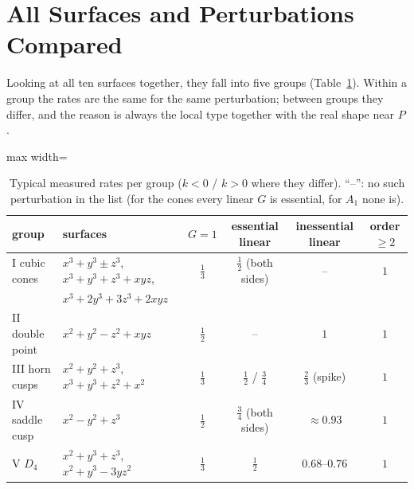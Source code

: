 \documentclass[12pt, a4paper, oneside]{book}
\theoremstyle{plain}
\theoremstyle{definition}
\theoremstyle{remark}
\theoremstyle{definition}
\begin{document}
\section{All Surfaces and Perturbations Compared}
\label{sec:r-groupF}

Looking at all ten surfaces together, they fall into five groups (Table~\ref{tab:r-groups}). Within a group the rates are the same for the same perturbation; between groups they differ, and the reason is always the local type together with the real shape near $P$.

\begin{table}[!h]
\centering
\small
\begin{adjustbox}{max width=\textwidth}
\begin{tabular}{l l c c c c}
\toprule
group & surfaces & $G=1$ & essential linear & inessential linear & order $\ge2$ \\
\midrule
I cubic cones & $x^3+y^3\pm z^3$, $x^3+y^3+z^3+xyz$, & $\tfrac13$ & $\tfrac12$ (both sides) & -- & $1$ \\
 & $x^3+2y^3+3z^3+2xyz$ & & & & \\
II double point & $x^2+y^2-z^2+xyz$ & $\tfrac12$ & -- & $1$ & $1$ \\
III horn cusps & $x^2+y^2+z^3$, $x^3+y^3+z^2+x^2$ & $\tfrac13$ & $\tfrac12$ / $\tfrac34$ & $\tfrac23$ (spike) & $1$ \\
IV saddle cusp & $x^2-y^2+z^3$ & $\tfrac12$ & $\tfrac34$ (both sides) & $\approx0.93$ & $1$ \\
V $D_4$ & $x^2+y^3+z^3$, $x^2+y^3-3yz^2$ & $\tfrac13$ & $\tfrac12$ & $0.68$--$0.76$ & $1$ \\
\bottomrule
\end{tabular}
\end{adjustbox}
\caption{Typical measured rates per group ($k<0$ / $k>0$ where they differ).
``--'': no such perturbation in the list (for the cones every linear $G$ is
essential, for $A_1$ none is).}
\label{tab:r-groups}
\end{table}
\end{document}

